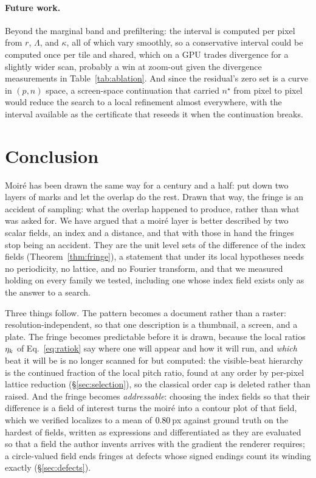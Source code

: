 \paragraph{Future work.}
\label{sec:future}
Beyond the marginal band and prefiltering: the interval is computed per pixel from
$r$, $\Lambda$, and $\kappa$, all of which vary smoothly, so a conservative
interval could be computed once per tile and shared, which on a GPU trades
divergence for a slightly wider scan, probably a win at zoom-out given the
divergence measurements in Table~\ref{tab:ablation}. And since the residual's
zero set is a curve in $(p, n)$ space, a screen-space continuation that carried
$n^\star$ from pixel to pixel would reduce the search to a local refinement almost
everywhere, with the interval available as the certificate that reseeds it when the
continuation breaks.

\section{Conclusion}

Moir\'e has been drawn the same way for a century and a half: put down two layers
of marks and let the overlap do the rest. Drawn that way, the fringe is an
accident of sampling: what the overlap happened to produce, rather than what
was asked for. We have argued that a moir\'e layer is better described by two
scalar fields, an index and a distance, and that with those in hand the fringes
stop being an accident. They are the unit level sets of the difference of the
index fields (Theorem~\ref{thm:fringe}), a statement that under its local
hypotheses needs no periodicity, no lattice, and no Fourier transform, and that
we measured holding on every family we tested, including one whose index
field exists only as the answer to a search.

Three things follow. The pattern becomes a document rather than a raster:
resolution-independent, so that one description is a thumbnail, a screen, and a
plate. The fringe becomes predictable before it is drawn, because the local
ratios $\eta_k$ of Eq.~\ref{eq:ratiok} say where one will appear and how it
will run, and \emph{which} beat it will be is no longer scanned for but
computed: the visible-beat hierarchy is the continued fraction of the local
pitch ratio, found at any order by per-pixel lattice reduction
(\S\ref{sec:selection}), so the classical order cap is deleted rather than
raised. And the fringe becomes \emph{addressable}:
choosing the index fields so that their difference is a field of interest turns
the moir\'e into a contour plot of that field, which we verified localizes to a
mean of $0.80$\,px against ground truth on the hardest of
\contourFieldCount{} fields, written as expressions and differentiated as they
are evaluated so that a field the author invents arrives with the gradient the
renderer requires; a circle-valued field ends fringes at defects whose signed
endings count its winding exactly (\S\ref{sec:defects}).

